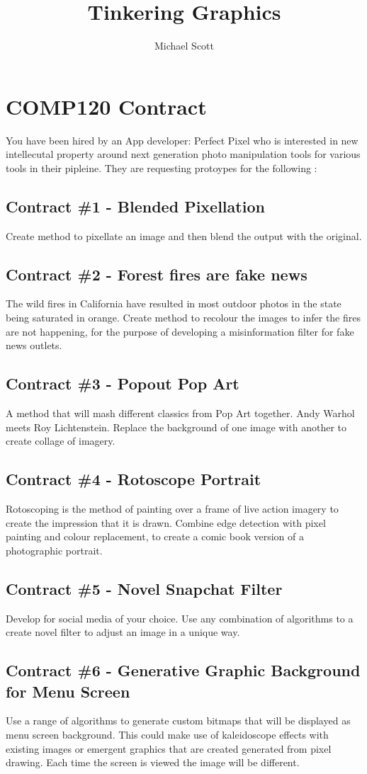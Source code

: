 \documentclass{../../fal_assignment}
\title{Tinkering Graphics}
\author{Michael Scott}
\begin{document}
\section*{COMP120 Contract}

You have been hired by an App developer: Perfect Pixel who is interested in new intellecutal property around next generation photo manipulation tools for various tools in their pipleine. They are requesting protoypes for the following  :

\subsection*{Contract \#1 - Blended Pixellation}
Create method to pixellate an image and then blend the output with the original.

\subsection*{Contract \#2 - Forest fires are fake news}
The wild fires in California have resulted in most outdoor photos in the state being saturated in orange. Create method to recolour the images to infer the fires are not happening, for the purpose of developing a misinformation filter for fake news outlets.

\subsection*{Contract \#3 - Popout Pop Art}
A method that will mash different classics from Pop Art together. Andy Warhol meets Roy Lichtenstein. Replace the background of one image with another to create collage of imagery.

\subsection*{Contract \#4 - Rotoscope Portrait}
Rotoscoping is the method of painting over a frame of live action imagery to create the impression that it is drawn. Combine edge detection with pixel painting and colour replacement, to create a comic book version of a photographic portrait.

\subsection*{Contract \#5 - Novel Snapchat Filter}
Develop for social media of your choice. Use any combination of algorithms to a create novel filter to adjust an image in a unique way.

\subsection*{Contract \#6 - Generative Graphic Background for Menu Screen}
Use a range of algorithms to generate custom bitmaps that will be displayed as menu screen background. This could make use of kaleidoscope effects with existing images or emergent graphics that are created generated from pixel drawing. Each time the screen is viewed the image will be different.	
\end{document}
